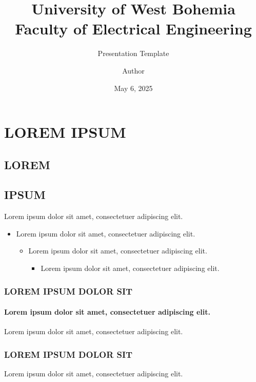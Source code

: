 \documentclass[11pt, aspectratio=169]{beamer}
\title[]{University of West Bohemia \\ Faculty of Electrical Engineering}
\author{Author}
\date{May 6, 2025}
\subtitle{Presentation Template}
\begin{document}
\begin{frame}
	\maketitle
\end{frame}

\begin{frame}
\end{frame}


\section{LOREM IPSUM}
\subsection{LOREM}
\subsection{IPSUM}

\begin{frame}[t]{\secname}{Lorem ipsum dolor sit amet, consectetuer adipiscing elit.}
	\begin{itemize}
		\item Lorem ipsum dolor sit amet, consectetuer adipiscing elit.
         \begin{itemize}
             \item Lorem ipsum dolor sit amet, consectetuer adipiscing elit.
             \begin{itemize}
                \item Lorem ipsum dolor sit amet, consectetuer adipiscing elit.
             \end{itemize}
         \end{itemize}
	\end{itemize}
\end{frame}

\begin{frame}[t]
    \frametitle{LOREM IPSUM DOLOR SIT}
    \framesubtitle{Lorem ipsum dolor sit amet, consectetuer adipiscing elit.}
    Lorem ipsum dolor sit amet, consectetuer adipiscing elit.
\end{frame}

\begin{frame}
    \frametitle{LOREM IPSUM DOLOR SIT}
    Lorem ipsum dolor sit amet, consectetuer adipiscing elit.
\end{frame}
\end{document}
